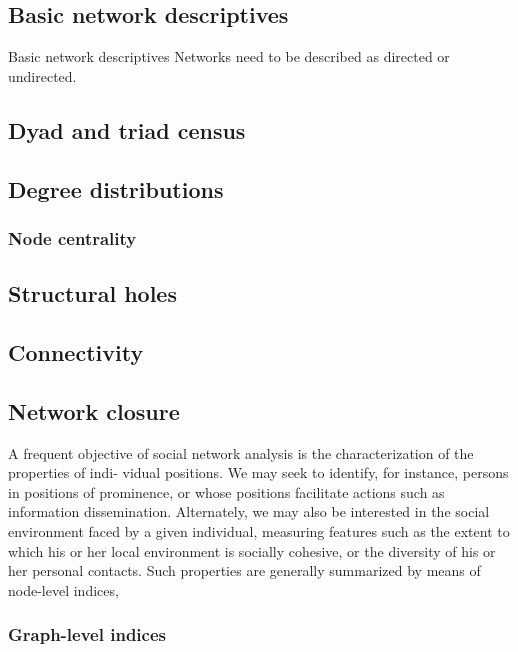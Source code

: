 
\subsection{Basic network descriptives}

Basic network descriptives Networks need to be described as directed or undirected. 

\subsection{Dyad and triad census}

\subsection{Degree distributions}

\subsubsection{Node centrality} 

\subsection{Structural holes}


\subsection{Connectivity}

\subsection{Network closure}

A frequent objective of social network analysis is the characterization of the properties of indi- vidual positions. We may seek to identify, for instance, persons in positions of prominence, or whose positions facilitate actions such as information dissemination. Alternately, we may also be interested in the social environment faced by a given individual, measuring features such as the extent to which his or her local environment is socially cohesive, or the diversity of his or her personal contacts. Such properties are generally summarized by means of node-level indices,

\subsubsection{Graph-level indices} 

